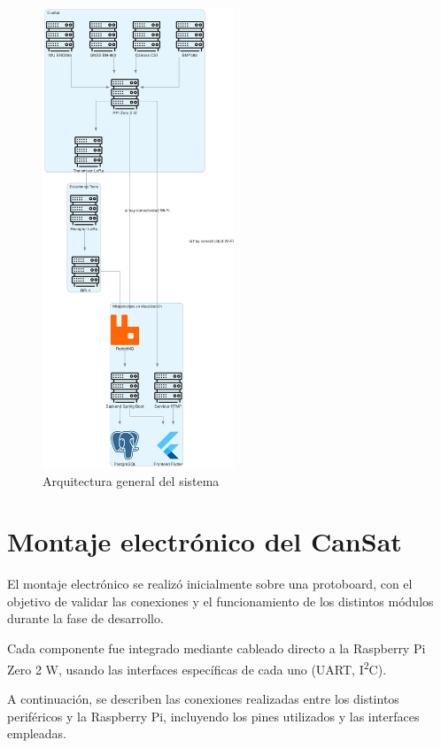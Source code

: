 \begin{figure}[H]
    \centering
    \includegraphics[width=0.51\textwidth]{Imagenes/Bitmap/cansat_architecture}
    \caption{Arquitectura general del sistema}
    \label{fig:cansat_architecture}
\end{figure}


\section{Montaje electrónico del CanSat}
El montaje electrónico se realizó inicialmente sobre una protoboard, con el objetivo de validar las conexiones y el funcionamiento de los distintos módulos durante la fase de desarrollo.

Cada componente fue integrado mediante cableado directo a la Raspberry Pi Zero 2 W, usando las interfaces específicas de cada uno (UART, I\textsuperscript{2}C).

A continuación, se describen las conexiones realizadas entre los distintos periféricos y la Raspberry Pi, incluyendo los pines utilizados y las interfaces empleadas.

